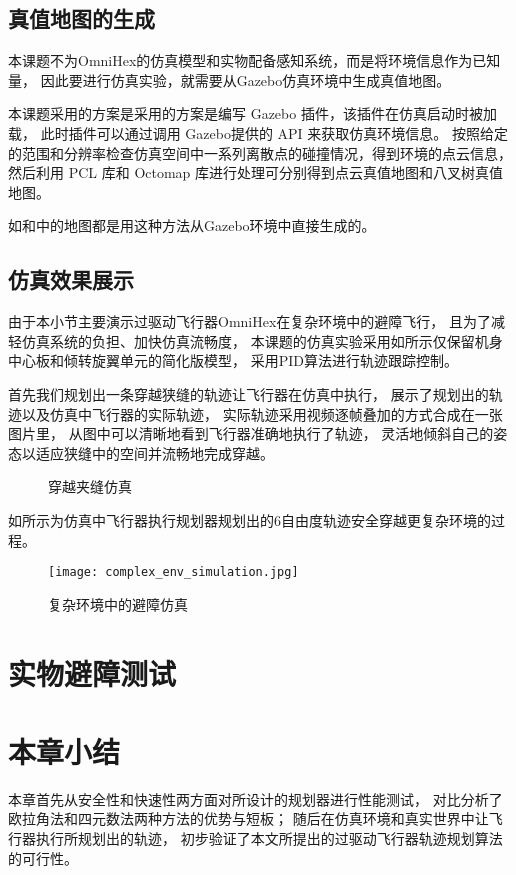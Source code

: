 \subsection{真值地图的生成}
本课题不为OmniHex的仿真模型和实物配备感知系统，而是将环境信息作为已知量，
因此要进行仿真实验，就需要从Gazebo仿真环境中生成真值地图。

本课题采用的方案是采用的方案是编写 Gazebo 插件，该插件在仿真启动时被加载，
此时插件可以通过调用 Gazebo提供的 API 来获取仿真环境信息。
按照给定的范围和分辨率检查仿真空间中一系列离散点的碰撞情况，得到环境的点云信息，
然后利用 PCL 库和 Octomap 库进行处理可分别得到点云真值地图和八叉树真值地图。

如和中的地图都是用这种方法从Gazebo环境中直接生成的。

\subsection{仿真效果展示}
由于本小节主要演示过驱动飞行器OmniHex在复杂环境中的避障飞行，
且为了减轻仿真系统的负担、加快仿真流畅度，
本课题的仿真实验采用如所示仅保留机身中心板和倾转旋翼单元的简化版模型，
采用PID算法进行轨迹跟踪控制。

首先我们规划出一条穿越狭缝的轨迹让飞行器在仿真中执行， 
展示了规划出的轨迹以及仿真中飞行器的实际轨迹，
实际轨迹采用视频逐帧叠加的方式合成在一张图片里，
从图中可以清晰地看到飞行器准确地执行了轨迹，
灵活地倾斜自己的姿态以适应狭缝中的空间并流畅地完成穿越。

\begin{figure}[!ht]
    \setlength{\subfigcapskip}{-1bp}
    \centering
    \begin{minipage}{\textwidth}
  
    \centering
    \subfigure{\label{fig:sim_narrow_gap_traj}}\addtocounter{subfigure}{-2}
    \hspace{0.2em}
    \subfigure{\label{fig:sim_narrow_gap_actual}}\addtocounter{subfigure}{-2}
    
    \end{minipage}
    \caption{穿越夹缝仿真}
    \label{fig:narrow_gap_simulation}
  \end{figure}

如所示为仿真中飞行器执行规划器规划出的6自由度轨迹安全穿越更复杂环境的过程。
\begin{figure}[ht]
    \centering
    \texttt{[image: complex\_env\_simulation.jpg]}
    \caption{复杂环境中的避障仿真}
    \label{fig:complex_env_simulation}
\end{figure}

\section{实物避障测试}\label{sec:real_world_experiments}

\section{本章小结}\label{sec:summary_5}
本章首先从安全性和快速性两方面对所设计的规划器进行性能测试，
对比分析了欧拉角法和四元数法两种方法的优势与短板；
随后在仿真环境和真实世界中让飞行器执行所规划出的轨迹，
初步验证了本文所提出的过驱动飞行器轨迹规划算法的可行性。
